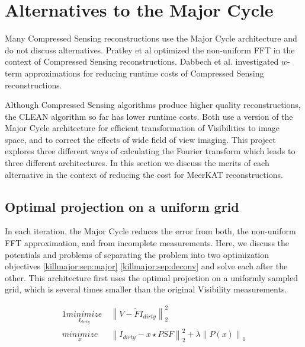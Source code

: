 \section{Alternatives to the Major Cycle}\label{killmajor}
Many Compressed Sensing reconstructions use the Major Cycle architecture\cite{girard2015sparse, dabbech2018cygnus, mcewen2011compressed, pratley2018fast}  and do not discuss alternatives. Pratley et al\cite{pratley2017robust} optimized the non-uniform FFT in the context of Compressed Sensing reconstructions. Dabbech et al.\cite{dabbech2017wEffect} investigated $w$-term approximations for reducing runtime costs of Compressed Sensing reconstructions.

Although Compressed Sensing algorithms produce higher quality reconstructions, the CLEAN algorithm so far has lower runtime costs. Both use a version of the Major Cycle architecture for efficient transformation of Visibilities to image space, and to correct the effects of wide field of view imaging. This project explores three different ways of calculating the Fourier transform which leads to three different architectures. In this section we discuss the merits of each alternative in the context of reducing the cost for MeerKAT reconstructions.

\subsection{Optimal projection on a uniform grid}
In each iteration, the Major Cycle reduces the error from both, the non-uniform FFT approximation, and from incomplete measurements. Here, we discuss the potentials and problems of separating the problem into two optimization objectives \eqref{killmajor:sep:major} \eqref{killmajor:sep:deconv} and solve each after the other. This architecture first uses the optimal projection on a uniformly sampled grid, which is several times smaller than the original Visibility measurements.

\begin{alignat}{1}
\underset{I_{dirty}}{minimize} \:& \left \|  V - \tilde{F}I_{dirty} \right \|_2^2\label{killmajor:sep:major}\\
\underset{x}{minimize} \:& \left \| I_{dirty} - x \star PSF \right \|_2^2 + \lambda \left \| P(x) \right \|_1 \label{killmajor:sep:deconv}
\end{alignat}

